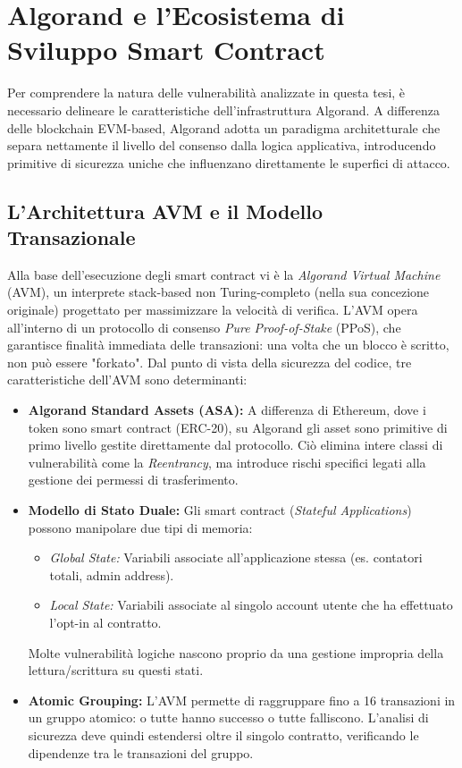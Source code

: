 \section{Algorand e l'Ecosistema di Sviluppo Smart Contract}
\label{sec:algorand_background}

Per comprendere la natura delle vulnerabilità analizzate in questa tesi, è necessario delineare le caratteristiche dell'infrastruttura Algorand. A differenza delle blockchain EVM-based, Algorand adotta un paradigma architetturale che separa nettamente il livello del consenso dalla logica applicativa, introducendo primitive di sicurezza uniche che influenzano direttamente le superfici di attacco.

\subsection{L'Architettura AVM e il Modello Transazionale}
Alla base dell'esecuzione degli smart contract vi è la \textit{Algorand Virtual Machine} (AVM), un interprete stack-based non Turing-completo (nella sua concezione originale) progettato per massimizzare la velocità di verifica.
L'AVM opera all'interno di un protocollo di consenso \textit{Pure Proof-of-Stake} (PPoS), che garantisce finalità immediata delle transazioni: una volta che un blocco è scritto, non può essere "forkato". Dal punto di vista della sicurezza del codice, tre caratteristiche dell'AVM sono determinanti:

\begin{itemize}
    \item \textbf{Algorand Standard Assets (ASA):} A differenza di Ethereum, dove i token sono smart contract (ERC-20), su Algorand gli asset sono primitive di primo livello gestite direttamente dal protocollo. Ciò elimina intere classi di vulnerabilità come la \textit{Reentrancy}, ma introduce rischi specifici legati alla gestione dei permessi di trasferimento.
    \item \textbf{Modello di Stato Duale:} Gli smart contract (\textit{Stateful Applications}) possono manipolare due tipi di memoria:
    \begin{itemize}
        \item \textit{Global State:} Variabili associate all'applicazione stessa (es. contatori totali, admin address).
        \item \textit{Local State:} Variabili associate al singolo account utente che ha effettuato l'opt-in al contratto.
    \end{itemize}
    Molte vulnerabilità logiche nascono proprio da una gestione impropria della lettura/scrittura su questi stati.
    \item \textbf{Atomic Grouping:} L'AVM permette di raggruppare fino a 16 transazioni in un gruppo atomico: o tutte hanno successo o tutte falliscono. L'analisi di sicurezza deve quindi estendersi oltre il singolo contratto, verificando le dipendenze tra le transazioni del gruppo.
\end{itemize}

